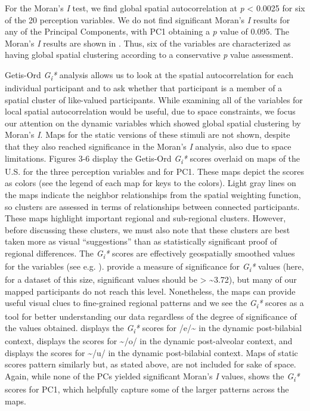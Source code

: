 \documentclass[output=paper]{LSP/langsci}
\begin{document}
For the Moran’s \textit{I }test, we find global spatial autocorrelation at \textit{p }{\textless} 0.0025 for six of the 20 perception variables. We do not find significant Moran’s \textit{I} results for any of the Principal Components, with PC1 obtaining a \textit{p} value of 0.095. The Moran’s \textit{I }results are shown in . Thus, six of the variables are characterized as having global spatial clustering according to a conservative \textit{p} value assessment.

Getis-Ord \textit{G}\textit{\textsubscript{i}}\textit{*} analysis allows us to look at the spatial autocorrelation for each individual participant and to ask whether that participant is a member of a spatial cluster of like-valued participants. While examining all of the variables for local spatial autocorrelation would be useful, due to space constraints, we focus our attention on the dynamic variables which showed global spatial clustering by Moran’s \textit{I}. Maps for the static versions of these stimuli are not shown, despite that they also reached significance in the Moran’s \textit{I} analysis, also due to space limitations. Figures 3-6 display the Getis-Ord \textit{G}\textit{\textsubscript{i}}\textit{* }scores overlaid on maps of the U.S. for the three perception variables and for PC1. These maps depict the scores as colors (see the legend of each map for keys to the colors). Light gray lines on the maps indicate the neighbor relationships from the spatial weighting function, so clusters are assessed in terms of relationships between connected participants. These maps highlight important regional and sub-regional clusters. However, before discussing these clusters, we must also note that these clusters are best taken more as visual “suggestions” than as statistically significant proof of regional differences. The \textit{G}\textit{\textsubscript{i}}\textit{* }scores are effectively geospatially smoothed values for the variables (see e.g. \citealt[37]{grieve_multivariate_2013}). \citet{ord_local_1995} provide a measure of significance for \textit{G}\textit{\textsubscript{i}}\textit{* }values (here, for a dataset of this size, significant values should be {\textgreater} \~{}{\textbar}3.72{\textbar}), but many of our mapped participants do not reach this level. Nonetheless, the maps can provide useful visual clues to fine-grained regional patterns and we see the \textit{G}\textit{\textsubscript{i}}\textit{*} scores as a tool for better understanding our data regardless of the degree of significance of the values obtained.  displays the \textit{G}\textit{\textsubscript{i}}\textit{*} scores for /e/\~{}
in the dynamic post-bilabial context,  displays the scores for 
\~{}/o/ in the dynamic post-alveolar context, and  displays the scores for 
\~{}/u/ in the dynamic post-bilabial context. Maps of static scores pattern similarly but, as stated above, are not included for sake of space. Again, while none of the PCs yielded significant Moran’s \textit{I} values,  shows the \textit{G}\textit{\textsubscript{i}}\textit{*} scores for PC1, which helpfully capture some of the larger patterns across the maps.
\end{document}
